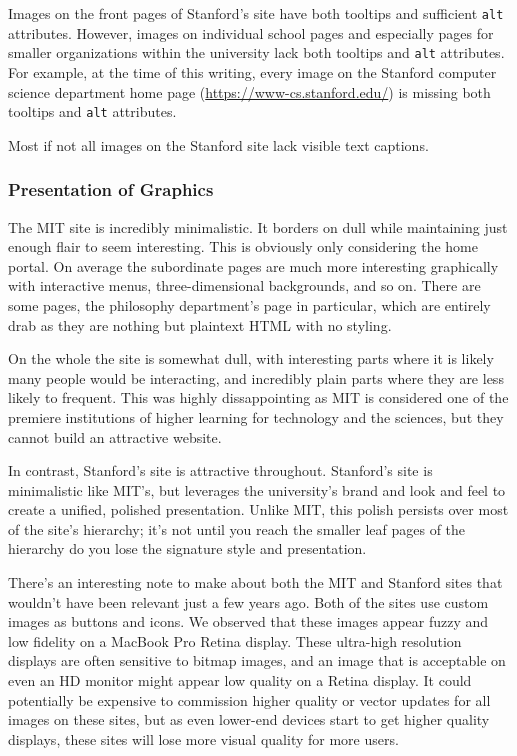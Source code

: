 Images on the front pages of Stanford's site have both tooltips and sufficient
\texttt{alt} attributes. However, images on individual school pages and especially
pages for smaller organizations within the university lack both tooltips and
\texttt{alt} attributes. For example, at the time of this writing, every image
on the Stanford computer science department home page (\url{https://www-cs.stanford.edu/})
is missing both tooltips and \texttt{alt} attributes.

Most if not all images on the Stanford site lack visible text captions.

\subsubsection*{Presentation of Graphics}

The MIT site is incredibly minimalistic. It borders on dull while maintaining just enough flair
to seem interesting. This is obviously only considering the home portal. On average the
subordinate pages are much more interesting graphically with interactive menus,
three-dimensional backgrounds, and so on. There are some pages, the philosophy department's
page in particular, which are entirely drab as they are nothing but plaintext HTML with no
styling.

On the whole the site is somewhat dull, with interesting parts where it is likely many
people would be interacting, and incredibly plain parts where they are less likely to
frequent. This was highly dissappointing as MIT is considered one of the premiere
institutions of higher learning for technology and the sciences, but they cannot build an
attractive website.

In contrast, Stanford's site is attractive throughout. Stanford's site is minimalistic
like MIT's, but leverages the university's brand and look and feel to create a unified,
polished presentation. Unlike MIT, this polish persists over most of the site's
hierarchy; it's not until you reach the smaller leaf pages of the hierarchy do you
lose the signature style and presentation.

There's an interesting note to make about both the MIT and Stanford sites that wouldn't
have been relevant just a few years ago. Both of the sites use custom images as buttons
and icons. We observed that these images appear fuzzy and low fidelity on a MacBook
Pro Retina display. These ultra-high resolution displays are often sensitive to
bitmap images, and an image that is acceptable on even an HD monitor might appear
low quality on a Retina display. It could potentially be expensive to commission
higher quality or vector updates for all images on these sites, but as even lower-end
devices start to get higher quality displays, these sites will lose more visual
quality for more users.

